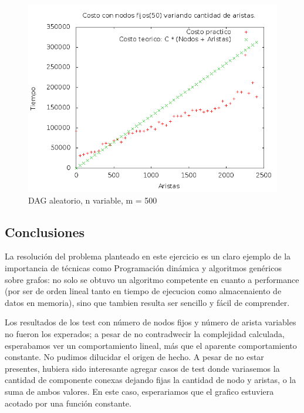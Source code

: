 \begin{figure}[H]
	\centering
	\includegraphics[scale=0.5]{blank.png}
	\caption{DAG aleatorio, n variable, m = 500}
\end{figure}



\subsection{Conclusiones}

La resoluci\'on del problema planteado en este ejercicio es un claro ejemplo de la importancia de t\'ecnicas como Programaci\'on din\'amica y algoritmos gen\'ericos sobre grafos: no solo se obtuvo un algoritmo competente en cuanto a performance (por ser de orden lineal tanto en tiempo de ejecucion como almacenaiento de datos en memoria), sino que tambien resulta ser sencillo y f\'acil de comprender.

Los resultados de los test con n\'umero de nodos fijos y n\'umero de arista variables no fueron los experados; a pesar de no contradwecir la complejidad calculada, esperabamos ver un comportamiento lineal, m\'as que el aparente comportamiento constante. No pudimos dilucidar el origen de hecho.
A pesar de no estar presentes, hubiera sido interesante agregar casos de test donde variasemos la cantidad de componente conexas dejando fijas la cantidad de nodo y aristas, o la suma de ambos valores. En este caso, esperariamos que el grafico estuviera acotado por una funci\'on constante.

